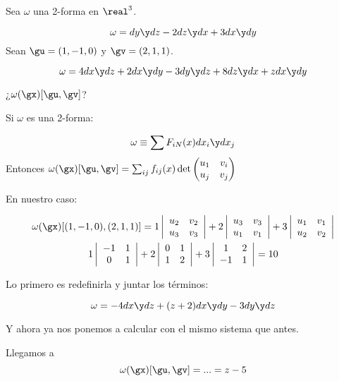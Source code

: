 \begin{problem}[1]
Sea $\omega$ una 2-forma en $\real^3$.

\ppart
\[\omega = dy\y dz - 2 dz\y dx + 3 dx\y dy\]
Sean $\gu = (1,-1,0)$ y $\gv = (2,1,1)$.

\ppart
\[\omega = 4dx\y dz + 2dx\y dy - 3 dy\y dz + 8 dz\y dx + zdx\y dy\]

¿$\omega(\gx)[\gu,\gv]$?


\solution
\spart
Si $\omega$ es una 2-forma:

\[\omega \equiv \sum F_{iN}(x)dx_i\y dx_j\]
Entonces $\omega(\gx)[\gu,\gv] = \sum_{ij} f_{ij}(x)\det \begin{pmatrix}
u_1&v_i\\u_j&v_j
\end{pmatrix}$

En nuestro caso:

\begin{gather*}
\omega(\gx)[(1,-1,0),(2,1,1)] = 1 \left|\begin{array}{cc}
u_2&v_2\\u_3&v_3
\end{array}\right| +
2 \left|\begin{array}{cc}
u_3&v_3\\u_1&v_1
\end{array}\right|+
3 \left|\begin{array}{cc}
u_1&v_1\\u_2&v_2
\end{array}\right|\\
1 \left|\begin{array}{cc}
-1&1\\0&1
\end{array}\right|
+
2 \left|\begin{array}{cc}
0&1\\1&2
\end{array}\right|
+
3 \left|\begin{array}{cc}
1&2\\-1&1
\end{array}\right| = 10
\end{gather*}

 \spart Lo primero es redefinirla y juntar los términos:

 \[\omega = -4dx\y dz + (z+2)dx\y dy - 3 dy\y dz\]

 Y ahora ya nos ponemos a calcular con el mismo sistema que antes.

 Llegamos a \[\omega(\gx)[\gu,\gv] = ... = z-5\]
\end{problem}

